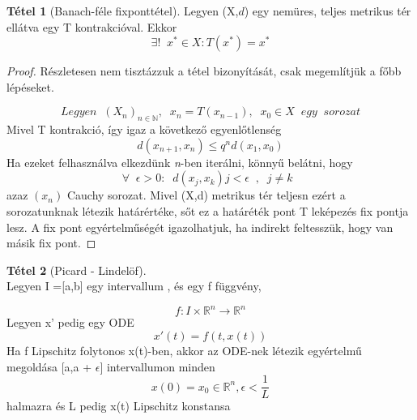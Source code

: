 \documentclass{article}
\theoremstyle{definition}
\theoremstyle{theorem}
\newtheorem{theorem}{Tétel}
\begin{document}
\begin{theorem}[Banach-féle fixponttétel]
Legyen (X,$\textit{d}$) egy nemüres, teljes metrikus tér ellátva egy T kontrakcióval. Ekkor
\begin{equation*}
    \exists!\;\; x^* \in X : T(x^*) = x^*
\end{equation*}
\end{theorem}
\begin{proof}
Részletesen nem tisztázzuk a tétel bizonyítását, csak megemlítjük a főbb lépéseket.

\begin{equation*}
Legyen\;\;(X_n)_{n \in \mathbb{N}},\;\; x_n = T(x_{n-1}), \;\;x_0 \in X \;\;egy \;\; sorozat
\end{equation*}
Mivel T kontrakció, így igaz a következő egyenlőtlenség
\begin{equation*}
    d(x_{n+1},x_n) \leq q^n d(x_1,x_0)
\end{equation*}
Ha ezeket felhasználva elkezdünk \textit{n}-ben iterálni, könnyű belátni, hogy
\begin{equation*}
    \forall \;\; \epsilon >0 : \;\;d(x_j,x_k) j < \epsilon\;\;, \;\;j\neq k  \;\;
\end{equation*}
azaz  $(x_n)$ Cauchy  sorozat.
Mivel (X,d) metrikus tér teljesn ezért a sorozatunknak létezik határértéke, sőt ez a határéték pont T leképezés fix pontja lesz. A fix pont egyértelműségét igazolhatjuk, ha indirekt feltesszük, hogy van másik fix pont.
\end{proof}
\begin{theorem} [Picard - Lindelöf] \\
Legyen I =[a,b] egy intervallum , és egy f függvény,

\begin{equation*}
f :  I \times \mathbb{R}^n \rightarrow \mathbb{R}^n
\end{equation*}
Legyen x' pedig egy ODE
\[
x'(t) = f(t,x(t))
\]
Ha f Lipschitz folytonos x(t)-ben, akkor az ODE-nek létezik egyértelmű megoldása [a,a + $\epsilon$]
intervallumon minden
\[
x(0) = x_0 \in \mathbb{R}^n, \epsilon < \frac{1}{L}
\] halmazra és L pedig x(t) Lipschitz konstansa
\end{theorem}
\end{document}
